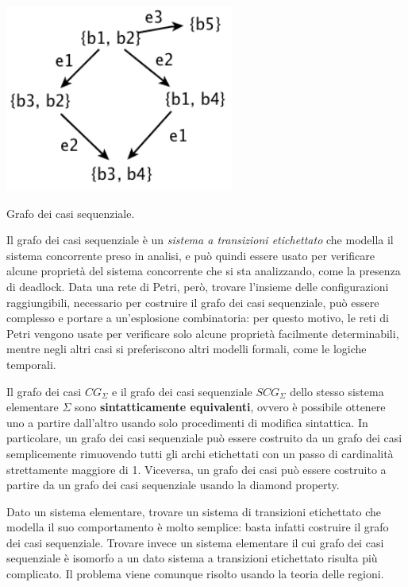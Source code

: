 \begin{marginfigure}
    \includegraphics[width=0.60\linewidth]{img/grafo_casi_sequenziale.png}
    \caption{Grafo dei casi sequenziale.}
    \label{fig:sequential_case_graph}
\end{marginfigure}

Il grafo dei casi sequenziale è un \textit{sistema a transizioni
etichettato} che modella il sistema concorrente preso in analisi,
e può quindi essere usato per verificare alcune proprietà del sistema
concorrente che si sta analizzando, come la presenza di deadlock.
Data una rete di Petri, però, trovare l'insieme delle configurazioni
raggiungibili, necessario per costruire il grafo dei casi sequenziale,
può essere complesso e portare a un'esplosione combinatoria: per questo motivo,
le reti di Petri vengono usate per verificare solo alcune proprietà facilmente
determinabili, mentre negli altri casi si preferiscono altri modelli
formali, come le logiche temporali.

\begin{property}
    Il grafo dei casi $CG_{\Sigma}$ e il grafo dei casi sequenziale
    $SCG_{\Sigma}$ dello stesso sistema elementare $\Sigma$ sono
    \textbf{sintatticamente equivalenti}, ovvero è possibile ottenere uno a
    partire dall'altro usando solo procedimenti di modifica sintattica.
    In particolare, un grafo dei casi sequenziale può essere costruito
    da un grafo dei casi semplicemente rimuovendo tutti gli archi
    etichettati con un passo di cardinalità strettamente maggiore di 1.
    Viceversa, un grafo dei casi può essere costruito a partire da un
    grafo dei casi sequenziale usando la diamond property.
\end{property}

\begin{rem}
    Dato un sistema elementare, trovare un sistema di transizioni etichettato
    che modella il suo comportamento è molto semplice: basta infatti costruire
    il grafo dei casi sequenziale.
    Trovare invece un sistema elementare il cui grafo dei casi sequenziale
    è isomorfo a un dato sistema a transizioni etichettato risulta più
    complicato. Il problema viene comunque risolto usando la teoria delle regioni.
\end{rem}

